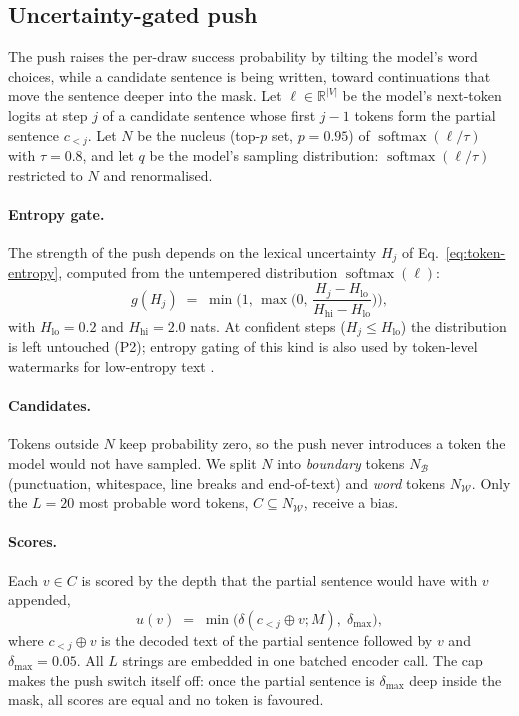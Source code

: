 \subsection{Uncertainty-gated push}
\label{sec:push}

The push raises the per-draw success probability by tilting the model's word choices, while a candidate sentence is being
written, toward continuations that move the sentence deeper into the mask. Let $\ell \in \mathbb{R}^{|V|}$ be the
model's next-token logits at step $j$ of a candidate sentence whose first $j - 1$ tokens form the partial sentence
$c_{<j}$. Let $N$ be the nucleus (top-$p$ set, $p = 0.95$) of $\operatorname{softmax}(\ell / \tau)$ with $\tau = 0.8$,
and let $q$ be the model's sampling distribution: $\operatorname{softmax}(\ell / \tau)$ restricted to $N$ and
renormalised.

\paragraph{Entropy gate.} The strength of the push depends on the lexical uncertainty $H_j$ of
Eq.~\eqref{eq:token-entropy}, computed from the untempered distribution $\operatorname{softmax}(\ell)$:
\begin{equation}
  g(H_j) \;=\; \min\!\Big( 1, \, \max\!\Big( 0, \, \frac{H_j - H_{\text{lo}}}{H_{\text{hi}} - H_{\text{lo}}} \Big) \Big) ,
  \label{eq:gate}
\end{equation}
with $H_{\text{lo}} = 0.2$ and $H_{\text{hi}} = 2.0$ nats. At confident steps ($H_j \le H_{\text{lo}}$) the distribution
is left untouched (P2); entropy gating of this kind is also used by token-level watermarks for low-entropy text
\citep{lee2024sweet}.

\paragraph{Candidates.} Tokens outside $N$ keep probability zero, so the push never introduces a token the model would
not have sampled. We split $N$ into \emph{boundary} tokens
$N_{\mathcal{B}}$ (punctuation, whitespace, line breaks and end-of-text) and \emph{word} tokens $N_{\mathcal{W}}$. Only
the $L = 20$ most probable word tokens, $C \subseteq N_{\mathcal{W}}$, receive a bias.

\paragraph{Scores.} Each $v \in C$ is scored by the depth that the partial sentence would have with $v$ appended,
\begin{equation}
  u(v) \;=\; \min\!\big( \delta(c_{<j} \oplus v; M), \; \delta_{\max} \big) ,
  \label{eq:score}
\end{equation}
where $c_{<j} \oplus v$ is the decoded text of the partial sentence followed by $v$ and $\delta_{\max} = 0.05$. All $L$
strings are embedded in one batched encoder call. The cap makes the push switch itself off: once the partial sentence is
$\delta_{\max}$ deep inside the mask, all scores are equal and no token is favoured.

